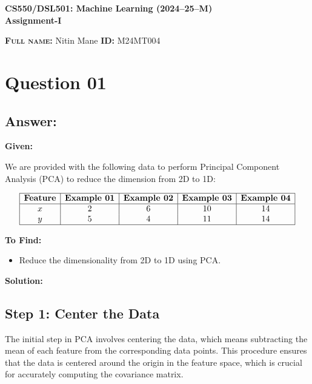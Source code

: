 \documentclass{exam}
\begin{document}
\begin{center}
\textbf{CS550/DSL501: Machine Learning (2024--25--M)} \\
\textbf{Assignment-I}
\end{center}

\vspace{0.2in}

\noindent
\textsc{\textbf{Full name:}} Nitin Mane \hspace{1in} \textsc{\textbf{ID:}} M24MT004

\vspace{0.2in}

\section{Question 01}

\subsection{Answer:}

\textbf{Given:}

We are provided with the following data to perform Principal Component Analysis (PCA) to reduce the dimension from 2D to 1D:

\[
\begin{array}{|c|c|c|c|c|}
\hline
\textbf{Feature} & \textbf{Example 01} & \textbf{Example 02} & \textbf{Example 03} & \textbf{Example 04} \\
\hline
x & 2 & 6 & 10 & 14 \\
y & 5 & 4 & 11 & 14 \\
\hline
\end{array}
\]

\textbf{To Find:} 
\begin{itemize}
    \item Reduce the dimensionality from 2D to 1D using PCA.
\end{itemize}

\textbf{Solution:}

\subsection{Step 1: Center the Data}

The initial step in PCA involves centering the data, which means subtracting the mean of each feature from the corresponding data points. This procedure ensures that the data is centered around the origin in the feature space, which is crucial for accurately computing the covariance matrix.
\end{document}
